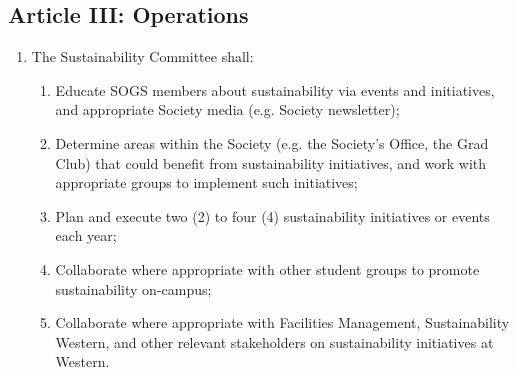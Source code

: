 \subsection{Article III: Operations}
\begin{enumerate}[label*=\arabic*., align=left]
\item The Sustainability Committee shall:
\begin{enumerate}[label*=\arabic*., align=left]	
\item Educate SOGS members about sustainability via events and initiatives, and appropriate Society media (e.g. Society newsletter);
\item Determine areas within the Society (e.g. the Society’s Office, the Grad Club) that could benefit from sustainability initiatives, and work with appropriate groups to implement such initiatives;
\item Plan and execute two (2) to four (4) sustainability initiatives or events each year;
\item Collaborate where appropriate with other student groups to promote sustainability on-campus;
\item Collaborate where appropriate with Facilities Management, Sustainability Western, and other relevant stakeholders on sustainability initiatives at Western.
\end{enumerate}
\end{enumerate}

